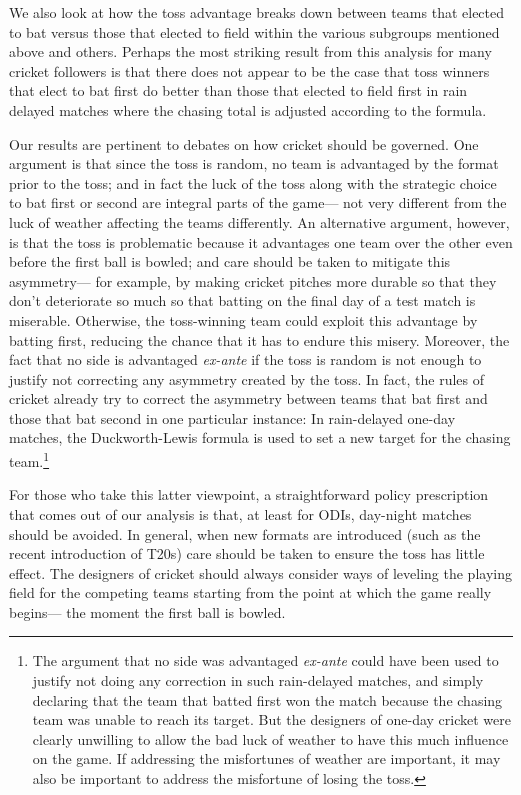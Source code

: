 \documentclass[11pt,  letterpaper]{article}
\begin{document}
We also look at how the toss advantage breaks down between teams that elected to bat versus those that elected to field within the various subgroups mentioned above and others. Perhaps the most striking result from this analysis for many cricket followers is that there does not appear to be the case that toss winners that elect to bat first do better than those that elected to field first in rain delayed matches where the chasing total is adjusted according to the \citet{duckworth1998} formula. 

Our results are pertinent to debates on how cricket should be governed. One argument is that since the toss is random, no team is advantaged by the format prior to the toss; and in fact the luck of the toss along with the strategic choice to bat first or second are integral parts of the game--- not very different from the luck of weather affecting the teams differently. 
An alternative argument, however, is that the toss is problematic because it advantages one team over the other even before the first ball is bowled; and care should be taken to mitigate this asymmetry--- for example, by making cricket pitches more durable so that they don't deteriorate so much so that batting on the final day of a test match is miserable. Otherwise, the toss-winning team could exploit this advantage by batting first, reducing the chance that it has to endure this misery. Moreover, the fact that no side is advantaged \emph{ex-ante} if the toss is random is not enough to justify not correcting any asymmetry created by the toss. In fact, the rules of cricket already try to correct the asymmetry between teams that bat first and those that bat second in one particular instance: In rain-delayed one-day matches, the Duckworth-Lewis formula is used to set a new target for the chasing team.\footnote{The argument that no side was advantaged \emph{ex-ante} could have been used to justify not doing any correction in such rain-delayed matches, and simply declaring that the team that batted first won the match because the chasing team was unable to reach its target. But the designers of one-day cricket were clearly unwilling to allow the bad luck of weather to have this much influence on the game. If addressing the misfortunes of weather are important, it may also be important to address the misfortune of losing the toss.} 

For those who take this latter viewpoint, a straightforward policy prescription that comes out of our analysis is that, at least for ODIs, day-night matches should be avoided. In general, when new formats are introduced (such as the recent introduction of T20s) care should be taken to ensure the toss has little effect. The designers of cricket should always consider ways of leveling the playing field for the competing teams starting from the point at which the game really begins--- the moment the first ball is bowled. 
\end{document}
